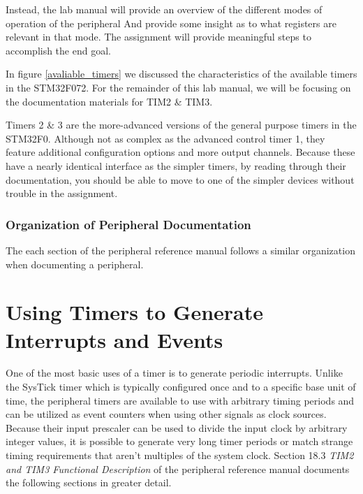 \documentclass[11pt,fleqn]{book} %
\begin{document}
    Instead, the lab manual will provide an overview of the different modes of operation of the peripheral And provide some insight as to what registers are relevant in that mode. The assignment will provide meaningful steps to accomplish the end goal. 

    In figure \ref{avaliable_timers} we discussed the characteristics of the available timers in the STM32F072. For the remainder of this lab manual, we will be focusing on the documentation materials for TIM2 \& TIM3. 
    
    Timers 2 \& 3 are the more-advanced versions of the general purpose timers in the STM32F0. Although not as complex as the advanced control timer 1, they feature additional configuration options and more output channels. Because these have a nearly identical interface as the simpler timers, by reading through their documentation, you should be able to move to one of the simpler devices without trouble in the assignment. 
    
    \subsubsection{Organization of Peripheral Documentation}
    The each section of the peripheral reference manual follows a similar organization when documenting a peripheral. 
    
%    
%    

\section{Using Timers to Generate Interrupts and Events}

    One of the most basic uses of a timer is to generate periodic interrupts. Unlike the SysTick timer which is typically configured once and to a specific base unit of time, the peripheral timers are available to use with arbitrary timing periods and can be utilized as event counters when using other signals as clock sources. Because their input prescaler can be used to divide the input clock by arbitrary integer values, it is possible to generate very long timer periods or match strange timing requirements that aren't multiples of the system clock. Section 18.3 \textit{TIM2 and TIM3 Functional Description} of the peripheral reference manual documents the following sections in greater detail. 
    
\end{document}
